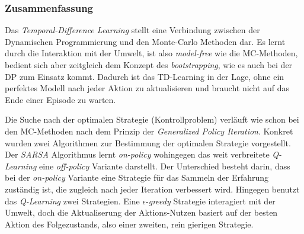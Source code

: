 \subsubsection{Zusammenfassung}
Das \textit{Temporal-Difference Learning} stellt eine Verbindung zwischen der Dynamischen Programmierung und den Monte-Carlo Methoden dar. Es lernt durch die Interaktion mit der Umwelt, ist also \textit{model-free} wie die MC-Methoden, bedient sich aber zeitgleich dem Konzept des \textit{bootstrapping}, wie es auch bei der DP zum Einsatz kommt. Dadurch ist das TD-Learning in der Lage, ohne ein perfektes Modell nach jeder Aktion zu aktualisieren und braucht nicht auf das Ende einer Episode zu warten.
\par 
Die Suche nach der optimalen Strategie (Kontrollproblem) verläuft wie schon bei den MC-Methoden nach dem Prinzip der \textit{Generalized Policy Iteration}. Konkret wurden zwei Algorithmen zur Bestimmung der optimalen Strategie vorgestellt. Der \textit{SARSA} Algorithmus lernt \textit{on-policy} wohingegen das weit verbreitete \textit{Q-Learning} eine \textit{off-policy} Variante darstellt. Der Unterschied besteht darin, dass bei der \textit{on-policy} Variante eine Strategie für das Sammeln der Erfahrung zuständig ist, die zugleich nach jeder Iteration verbessert wird. Hingegen benutzt das \textit{Q-Learning} zwei Strategien. Eine $\epsilon$-\textit{greedy} Strategie interagiert mit der Umwelt, doch die Aktualiserung der Aktions-Nutzen basiert auf der besten Aktion des Folgezustands, also einer zweiten, rein gierigen Strategie.